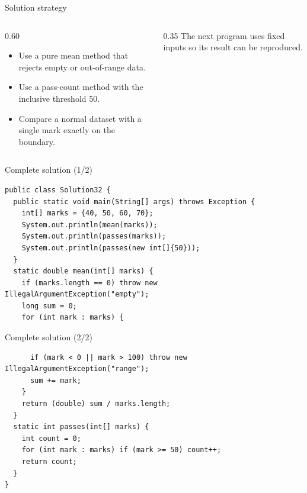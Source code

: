 \documentclass[10pt,aspectratio=169]{beamer}
\begin{document}
\begin{frame}[fragile,t]{Solution strategy}
\begin{columns}[T,onlytextwidth]\begin{column}{0.60\textwidth}
\begin{itemize}
\item Use a pure mean method that rejects empty or out-of-range data.
\item Use a pass-count method with the inclusive threshold 50.
\item Compare a normal dataset with a single mark exactly on the boundary.
\end{itemize}
\end{column}\begin{column}{0.35\textwidth}\small
The next program uses fixed inputs so its result can be reproduced.
\end{column}\end{columns}
\end{frame}

\begin{frame}[fragile,t]{Complete solution (1/2)}
\begin{lstlisting}
public class Solution32 {
  public static void main(String[] args) throws Exception {
    int[] marks = {40, 50, 60, 70};
    System.out.println(mean(marks));
    System.out.println(passes(marks));
    System.out.println(passes(new int[]{50}));
  }
  static double mean(int[] marks) {
    if (marks.length == 0) throw new IllegalArgumentException("empty");
    long sum = 0;
    for (int mark : marks) {
\end{lstlisting}
\end{frame}

\begin{frame}[fragile,t]{Complete solution (2/2)}
\begin{lstlisting}
      if (mark < 0 || mark > 100) throw new IllegalArgumentException("range");
      sum += mark;
    }
    return (double) sum / marks.length;
  }
  static int passes(int[] marks) {
    int count = 0;
    for (int mark : marks) if (mark >= 50) count++;
    return count;
  }
}
\end{lstlisting}
\end{frame}
\end{document}
